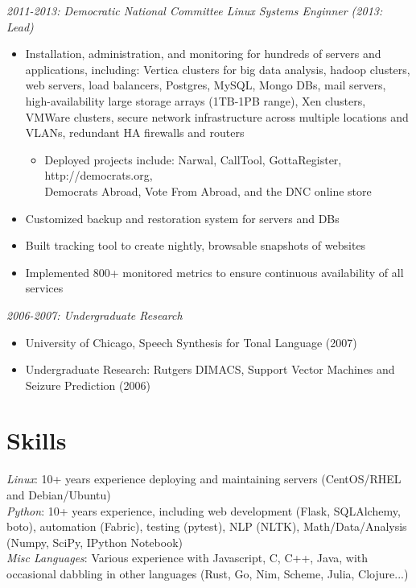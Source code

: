 \documentclass[line]{res} %
\begin{document}
\begin{resume}
    {\sl 2011-2013: Democratic National Committee Linux Systems Enginner (2013: Lead)}
        \begin{itemize}
            \item Installation, administration, and monitoring for hundreds of servers and applications, including: Vertica clusters for big data analysis, hadoop clusters, web servers, load balancers, Postgres, MySQL, Mongo DBs, mail servers, high-availability large storage arrays (1TB-1PB range), Xen clusters, VMWare clusters, secure network infrastructure across multiple locations and VLANs, redundant HA firewalls and routers
            \begin{itemize}
                \item Deployed projects include: Narwal, CallTool, GottaRegister, http://democrats.org, \\Democrats Abroad, Vote From Abroad, and the DNC online store
                \end{itemize}
            \item Customized backup and restoration system for servers and DBs
            \item Built tracking tool to create nightly, browsable snapshots of websites
            \item Implemented 800+ monitored metrics to ensure continuous availability of all services
        \end{itemize}

{\sl 2006-2007: Undergraduate Research}
    \begin{itemize} 
        \item University of Chicago, Speech Synthesis for Tonal Language (2007)
        \item Undergraduate Research: Rutgers DIMACS, Support Vector Machines and Seizure Prediction (2006)
    \end{itemize}

\section{Skills}
{\sl Linux}: 10+ years experience deploying and maintaining servers (CentOS/RHEL and Debian/Ubuntu)\\
{\sl Python}: 10+ years experience, including web development (Flask, SQLAlchemy, boto), automation (Fabric), testing (pytest), NLP (NLTK), Math/Data/Analysis (Numpy, SciPy, IPython Notebook) \\
{\sl Misc Languages}: Various experience with Javascript, C, C++, Java, with occasional dabbling in other languages (Rust, Go, Nim, Scheme, Julia, Clojure...)


\end{resume}
\end{document}
